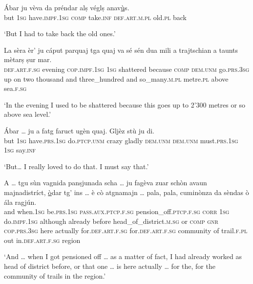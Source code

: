 \begin{linenumbers}
\gll Ábar ju vèva da préndar alṣ véglṣ anav\underline{ù}s.   \\
but \textsc{1sg} have.\textsc{impf.1sg} \textsc{comp} take.\textsc{inf} \textsc{def.art.m.pl} old.\textsc{pl} back \\
\end{linenumbers}
\medskip
\glt `But I had to take back the old ones.'
\medskip

\begin{linenumbers}
\gll  La sèra èr’ ju cáput parquaj tga quaj va sé sén dua mili a trajtschian a taunts mètarṣ ṣur mar. \\
 \textsc{def.art.f.sg} evening \textsc{cop.impf.1sg} \textsc{1sg} shattered because \textsc{comp} \textsc{dem.unm} go.\textsc{prs.3sg} up on two thousand and three\_hundred and  so\_many.\textsc{m.pl} metre.\textsc{pl} above sea.\textsc{f.sg}\\
\end{linenumbers}
\medskip
\glt `In the evening I used to be shattered because this goes up to 2'300 metres or so above sea level.'
\medskip

\begin{linenumbers}
\gll  Ábar … ju a fatg faruct ugèn quaj. Gljèz stù ju di.  \\
but {} \textsc{1sg} have.\textsc{prs.1sg} do.\textsc{ptcp.unm} crazy gladly \textsc{dem.unm} \textsc{dem.unm} must.\textsc{prs.1sg} \textsc{1sg} say.\textsc{inf}\\ 
\end{linenumbers}
\medskip
\glt `But… I really loved to do that. I must say that.'
\medskip

\begin{linenumbers}
\gll  A … tgu sùn vagnida panṣjunada scha … ju fagèva zuar schòn avaun majnadistríct, \underline{ò}dar tg’ ins … è cò atgnamajn … pala, pala, cuminònza da sèndas ò ála ragjún.  \\
and {} when.\textsc{1sg} be.\textsc{prs.1sg} \textsc{pass.aux.ptcp.f.sg} pension\_off.\textsc{ptcp.f.sg} \textsc{corr} {} \textsc{1sg} do.\textsc{impf.1sg} although already before head\_of\_district.\textsc{m.sg} or \textsc{comp} \textsc{gnr} {} \textsc{cop.prs.3sg} here actually {} for.\textsc{def.art.f.sg} for.\textsc{def.art.f.sg} community of trail.\textsc{f.pl} out in.\textsc{def.art.f.sg} region\\
\end{linenumbers}
\medskip
\glt `And … when I got pensioned off … as a matter of fact, I had already worked as head of district before, or that one … is here actually … for the, for the community of trails in the region.'
\medskip
 
